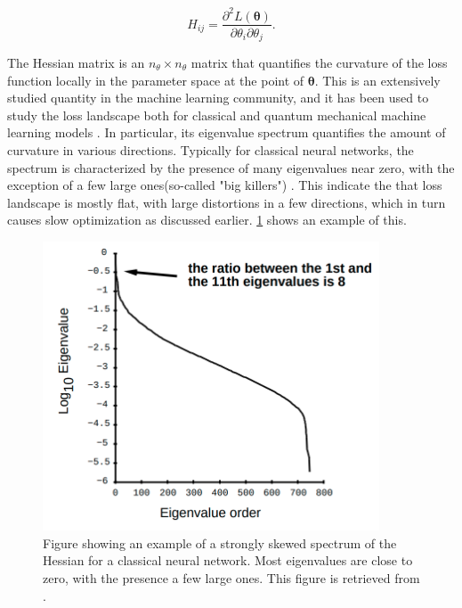 \begin{equation}
\label{eq:Hessian}
    H_{ij} = \frac{\partial^2 L(\boldsymbol{\theta})}{\partial \theta_i\partial \theta_j}.
\end{equation}

The Hessian matrix is an $n_\theta \times n_\theta$ matrix that quantifies the curvature of the loss function locally in the parameter space at the point of $\boldsymbol{\theta}$. This is an extensively studied quantity in the machine learning community, and it has been used to study the loss landscape both for classical and quantum mechanical machine learning models \cite{LeCun2012, Huembeli_2021}. In particular, its eigenvalue spectrum quantifies the amount of curvature in various directions. Typically for classical neural networks, the spectrum is characterized by the presence of many eigenvalues near zero, with the exception of a few large ones(so-called "big killers") \cite{LeCun2012}. This indicate the that loss landscape is mostly flat, with large distortions in a few directions, which in turn causes slow optimization as discussed earlier. \cref{fig:spectrumExample} shows an example of this.

\begin{figure}[H]
    \centering
    \includegraphics[width=10cm]{latex/figures/spectrum.png}
    \caption{Figure showing an example of a strongly skewed spectrum of the Hessian for a classical neural network. Most eigenvalues are close to zero, with the presence a few large ones. This figure is retrieved from \citet{LeCun2012}.}
\label{fig:spectrumExample}
\end{figure}

